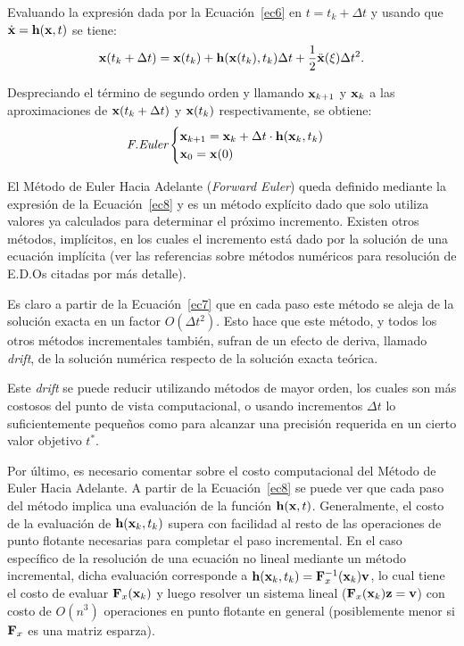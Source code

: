 Evaluando la expresión dada por la Ecuación~\eqref{ec6} en $t=t_k+\Delta t$ y usando que $\dot{{\bf x}}={\bf h}({\bf x},t)$ se tiene:
%
\begin{equation}\label{ec7}
{\bf x}(t_k+\Delta t)={\bf x}(t_k) + {\bf h}({\bf x}(t_k),t_k)\Delta t + \frac{1}{2}\ddot{{\bf x}}(\xi)\Delta t^2.
\end{equation}

Despreciando el término de segundo orden y llamando ${\bf x}_{k+1}$ y ${\bf x}_k$ a las aproximaciones de ${\bf x}(t_k+\Delta t)$ y ${\bf x}(t_k)$ respectivamente, se obtiene:
%
\begin{equation}\label{ec8}
\textit{F.Euler}
	\begin{cases} 
	{\bf x}_{k+1}={\bf x}_k + \Delta t\cdot {\bf h}({\bf x}_k,t_k) \\
	{\bf x}_0={\bf x}(0)
	\end{cases}
\end{equation}

El Método de Euler Hacia Adelante (\textit{Forward Euler}) queda definido mediante la expresión de la Ecuación~\eqref{ec8} y es un método explícito dado que solo utiliza valores ya calculados para determinar el próximo incremento. %
%
Existen otros métodos, implícitos, en los cuales el incremento está dado por la solución de una ecuación implícita (ver las referencias sobre métodos numéricos para resolución de E.D.Os citadas por más detalle).

Es claro a partir de la Ecuación~\eqref{ec7} que en cada paso este método se aleja de la solución exacta en un factor $O(\Delta t^2)$. Esto hace que este método, y todos los otros métodos incrementales también, sufran de un efecto de deriva, llamado \textit{drift}, de la solución numérica respecto de la solución exacta teórica.

Este \textit{drift} se puede reducir utilizando métodos de mayor orden, los cuales son más costosos del punto de vista computacional, o usando incrementos $\Delta t$ lo suficientemente pequeños como para alcanzar una precisión requerida en un cierto valor objetivo $t^*$.

Por último, es necesario comentar sobre el costo computacional del Método de Euler Hacia Adelante. %
%
A partir de la Ecuación~\eqref{ec8} se puede ver que cada paso del método implica una evaluación de la función ${\bf h}({\bf x},t)$. %
%
Generalmente, el costo de la evaluación de ${\bf h}({\bf x}_k,t_k)$ supera con facilidad al resto de las operaciones de punto flotante necesarias para completar el paso incremental. %
%
En el caso específico de la resolución de una ecuación no lineal mediante un método incremental, dicha evaluación corresponde a ${\bf h}({\bf x}_k,t_k)={\bf F}_x^{-1}({\bf x}_k){\bf v}$, lo cual tiene el costo de evaluar ${\bf F}_x({\bf x}_k)$ y luego resolver un sistema lineal (${\bf F}_x({\bf x}_k){\bf z}={\bf v}$) con costo de $O(n^3)$ operaciones en punto flotante en general (posiblemente menor si ${\bf F}_x$ es una matriz esparza).

